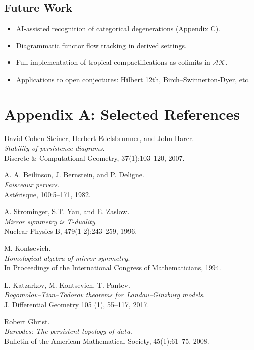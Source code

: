 \documentclass[11pt]{article}
\begin{document}
\subsection*{Future Work}
\begin{itemize}
    \item AI-assisted recognition of categorical degenerations (Appendix C).
    \item Diagrammatic functor flow tracking in derived settings.
    \item Full implementation of tropical compactifications as colimits in \( \mathcal{AK} \).
    \item Applications to open conjectures: Hilbert 12th, Birch–Swinnerton-Dyer, etc.
\end{itemize}




\section*{Appendix A: Selected References}

\begin{thebibliography}{9}

David Cohen-Steiner, Herbert Edelsbrunner, and John Harer.\\
\textit{Stability of persistence diagrams}.\\
Discrete \& Computational Geometry, 37(1):103--120, 2007.

A. A. Beilinson, J. Bernstein, and P. Deligne.\\
\textit{Faisceaux pervers}.\\
Ast\'erisque, 100:5–171, 1982.

A. Strominger, S.T. Yau, and E. Zaslow.\\
\textit{Mirror symmetry is T-duality}.\\
Nuclear Physics B, 479(1-2):243–259, 1996.

M. Kontsevich.\\
\textit{Homological algebra of mirror symmetry}.\\
In Proceedings of the International Congress of Mathematicians, 1994.

L. Katzarkov, M. Kontsevich, T. Pantev.\\
\textit{Bogomolov–Tian–Todorov theorems for Landau–Ginzburg models}.\\
J. Differential Geometry 105 (1), 55–117, 2017.

Robert Ghrist.\\
\textit{Barcodes: The persistent topology of data}.\\
Bulletin of the American Mathematical Society, 45(1):61--75, 2008.

\end{thebibliography}
\end{document}

